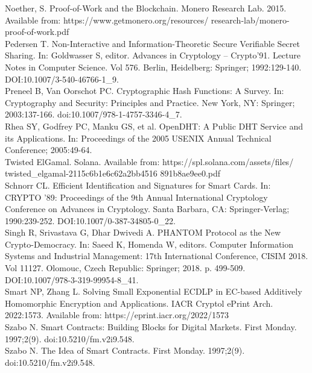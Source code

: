 \documentclass[10pt,a4paper,twocolumn]{article}
\begin{document}
Noether, S. Proof-of-Work and the Blockchain. Monero Research Lab. 2015. Available from: https://www.getmonero.org/resources/
research-lab/monero-proof-of-work.pdf \\

Pedersen T. Non-Interactive and Information-Theoretic Secure Verifiable Secret Sharing. In: Goldwasser S, editor. Advances in Cryptology – Crypto’91. Lecture Notes in Computer Science. Vol 576. Berlin, Heidelberg: Springer; 1992:129-140. DOI:10.1007/3-540-46766-1\_9.\\

Preneel B, Van Oorschot PC. Cryptographic Hash Functions: A Survey. In: Cryptography and Security: Principles and Practice. New York, NY: Springer; 2003:137-166. doi:10.1007/978-1-4757-3346-4\_7.\\

Rhea SY, Godfrey PC, Manku GS, et al. OpenDHT: A Public DHT Service and its Applications. In: Proceedings of the 2005 USENIX Annual Technical Conference; 2005:49-64.\\

Twisted ElGamal. Solana. Available from: https://spl.solana.com/assets/files/ twisted\_elgamal-2115c6b1e6c62a2bb4516 891b8ae9ee0.pdf\\

Schnorr CL. Efficient Identification and Signatures for Smart Cards. In: CRYPTO '89: Proceedings of the 9th Annual International Cryptology Conference on Advances in Cryptology. Santa Barbara, CA: Springer-Verlag; 1990:239-252. DOI:10.1007/0-387-34805-0\_22.\\

Singh R, Srivastava G, Dhar Dwivedi A. PHANTOM Protocol as the New Crypto-Democracy. In: Saeed K, Homenda W, editors. Computer Information Systems and Industrial Management: 17th International Conference, CISIM 2018. Vol 11127. Olomouc, Czech Republic: Springer; 2018. p. 499-509. DOI:10.1007/978-3-319-99954-8\_41.\\

Smart NP, Zhang L. Solving Small Exponential ECDLP in EC-based Additively Homomorphic Encryption and Applications. IACR Cryptol ePrint Arch. 2022:1573. Available from: https://eprint.iacr.org/2022/1573\\

Szabo N. Smart Contracts: Building Blocks for Digital Markets. First Monday. 1997;2(9). doi:10.5210/fm.v2i9.548.\\

Szabo N. The Idea of Smart Contracts. First Monday. 1997;2(9). doi:10.5210/fm.v2i9.548.\\
\end{document}
